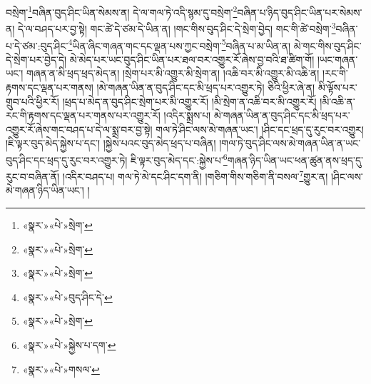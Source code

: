 བསྲེག་\footnote{«སྣར་»«པེ་»སྲེག་}བཞིན་བུད་ཤིང་ཡིན་སེམས་ན། དེ་ལ་གལ་ཏེ་འདི་སྙམ་དུ་བསྲེག་\footnote{«སྣར་»«པེ་»སྲེག་}བཞིན་པ་ཉིད་བུད་ཤིང་ཡིན་པར་སེམས་ན། དེ་ལ་བཤད་པར་བྱ་སྟེ། གང་ཚེ་དེ་ཙམ་དེ་ཡིན་ན། །གང་གིས་བུད་ཤིང་དེ་སྲེག་བྱེད། གང་གི་ཚེ་བསྲེག་\footnote{«སྣར་»«པེ་»སྲེག་}བཞིན་པ་དེ་ཙམ་:བུད་ཤིང་\footnote{«སྣར་»«པེ་»བུད་ཤིང་དེ་}ཡིན་ཞིང་གཞན་གང་དང་ལྡན་པས་ཀྱང་བསྲེག་\footnote{«སྣར་»«པེ་»སྲེག་}བཞིན་པ་མ་ཡིན་ན། མེ་གང་གིས་བུད་ཤིང་དེ་སྲེག་པར་བྱེད་དེ། མེ་མེད་པར་ཡང་བུད་ཤིང་ཡིན་པར་ཐལ་བར་འགྱུར་རོ་ཞེས་བྱ་བའི་ཐ་ཚིག་གོ། །ཡང་གཞན་ཡང་། གཞན་ན་མི་ཕྲད་ཕྲད་མེད་ན། །སྲེག་པར་མི་འགྱུར་མི་སྲེག་ན། །འཆི་བར་མི་འགྱུར་མི་འཆི་ན། །རང་གི་རྟགས་དང་ལྡན་པར་གནས། །མེ་གཞན་ཡིན་ན་བུད་ཤིང་དང་མི་ཕྲད་པར་འགྱུར་ཏེ། ཅིའི་ཕྱིར་ཞེ་ན། མི་ལྟོས་པར་གྲུབ་པའི་ཕྱིར་རོ། །ཕྲད་པ་མེད་ན་བུད་ཤིང་སྲེག་པར་མི་འགྱུར་རོ། །མི་སྲེག་ན་འཆི་བར་མི་འགྱུར་རོ། །མི་འཆི་ན་རང་གི་རྟགས་དང་ལྡན་པར་གནས་པར་འགྱུར་རོ། །འདིར་སྨྲས་པ། མེ་གཞན་ཡིན་ན་བུད་ཤིང་དང་མི་ཕྲད་པར་འགྱུར་རོ་ཞེས་གང་བཤད་པ་དེ་ལ་སྨྲ་བར་བྱ་སྟེ། གལ་ཏེ་ཤིང་ལས་མེ་གཞན་ཡང་། །ཤིང་དང་ཕྲད་དུ་རུང་བར་འགྱུར། །ཇི་ལྟར་བུད་མེད་སྐྱེས་པ་དང་། །སྐྱེས་པའང་བུད་མེད་ཕྲད་པ་བཞིན། །གལ་ཏེ་བུད་ཤིང་ལས་མེ་གཞན་ཡིན་ན་ཡང་བུད་ཤིང་དང་ཕྲད་དུ་རུང་བར་འགྱུར་ཏེ། ཇི་ལྟར་བུད་མེད་དང་:སྐྱེས་པ་\footnote{«སྣར་»«པེ་»སྐྱེས་པ་དག་}གཞན་ཉིད་ཡིན་ཡང་ཕན་ཚུན་ནས་ཕྲད་དུ་རུང་བ་བཞིན་ནོ། །འདིར་བཤད་པ། གལ་ཏེ་མེ་དང་ཤིང་དག་ནི། །གཅིག་གིས་གཅིག་ནི་བསལ་\footnote{«སྣར་»«པེ་»གསལ་}གྱུར་ན། །ཤིང་ལས་མེ་གཞན་ཉིད་ཡིན་ཡང་། །
